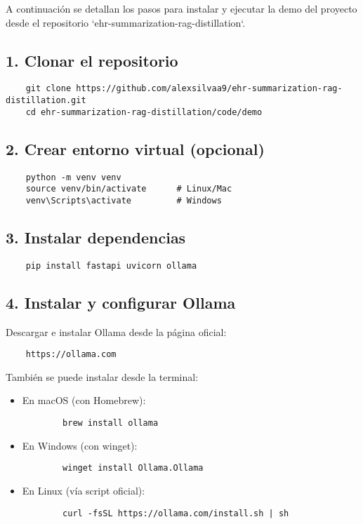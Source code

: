 
A continuación se detallan los pasos para instalar y ejecutar la demo del proyecto desde el repositorio `ehr-summarization-rag-distillation`.

\subsection*{1. Clonar el repositorio}

\begin{lstlisting}
	git clone https://github.com/alexsilvaa9/ehr-summarization-rag-distillation.git
	cd ehr-summarization-rag-distillation/code/demo
\end{lstlisting}

\subsection*{2. Crear entorno virtual (opcional)}

\begin{lstlisting}
	python -m venv venv
	source venv/bin/activate      # Linux/Mac
	venv\Scripts\activate         # Windows
\end{lstlisting}

\subsection*{3. Instalar dependencias}

\begin{lstlisting}
	pip install fastapi uvicorn ollama
\end{lstlisting}

\subsection*{4. Instalar y configurar Ollama}

Descargar e instalar Ollama desde la página oficial:

\begin{lstlisting}
	https://ollama.com
\end{lstlisting}

También se puede instalar desde la terminal:

\begin{itemize}
	\item En macOS (con Homebrew):
	\begin{lstlisting}
		brew install ollama
	\end{lstlisting}
	
	\item En Windows (con winget):
	\begin{lstlisting}
		winget install Ollama.Ollama
	\end{lstlisting}
	
	\item En Linux (vía script oficial):
	\begin{lstlisting}
		curl -fsSL https://ollama.com/install.sh | sh
	\end{lstlisting}
\end{itemize}


